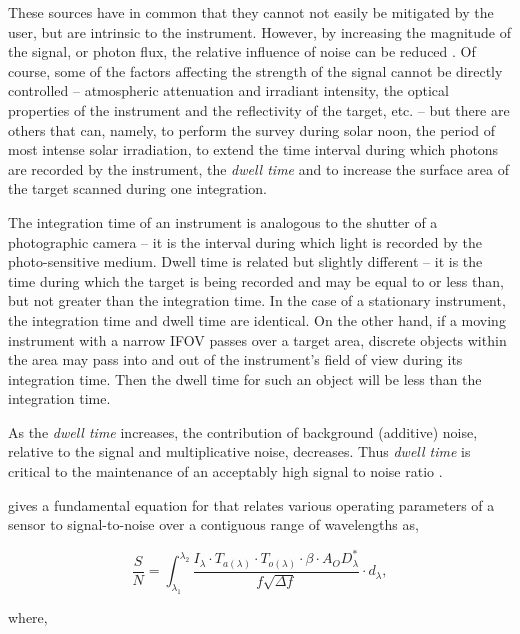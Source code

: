 These sources have in common that they cannot not easily be mitigated by the user, but are intrinsic to the instrument. However, by increasing the magnitude of the signal, or photon flux, the relative influence of noise can be reduced \cite{Dor2012}. Of course, some of the factors affecting the strength of the signal cannot be directly controlled -- atmospheric attenuation and irradiant intensity, the optical properties of the instrument and the reflectivity of the target, etc. -- but there are others that can, namely, to perform the survey during solar noon, the period of most intense solar irradiation, to extend the time interval during which photons are recorded by the instrument, the \emph{dwell time} \cite{Gupta2018,Goetz1985,Dor2012} and to increase the surface area of the target scanned during one integration.

The integration time of an instrument is analogous to the shutter of a photographic camera -- it is the interval during which light is recorded by the photo-sensitive medium. Dwell time is related but slightly different -- it is the time during which the target is being recorded and may be equal to or less than, but not greater than the integration time. In the case of a stationary instrument, the integration time and dwell time are identical. On the other hand, if a moving instrument with a narrow IFOV passes over a target area, discrete objects within the area may pass into and out of the instrument's field of view during its integration time. Then the dwell time for such an object will be less than the integration time.

As the \emph{dwell time} increases, the contribution of background (additive) noise, relative to the signal and multiplicative noise, decreases. Thus \emph{dwell time} is critical to the maintenance of an acceptably high signal to noise ratio \cite{F.MarkDanson1996,Avery1992,Rogass2014}. 

\cite{Gupta2018} gives a fundamental equation for that relates various operating parameters of a sensor to signal-to-noise over a contiguous range of wavelengths as, 

\begin{equation}
\frac{S}{N} = \int_{\lambda_1}^{\lambda_2} \frac{ 
	I_{\lambda} \cdot T_{a(\lambda)} \cdot T_{o(\lambda)} \cdot \beta \cdot A_{O}D_{\lambda}^*
} {
	f \sqrt{\Delta f}
} \cdot d_{\lambda},
\end{equation}

where,

